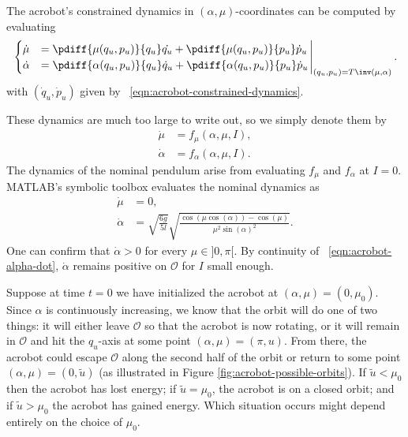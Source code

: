 The acrobot's constrained dynamics in
\((\alpha,\mu)\)-coordinates can be computed by evaluating
\begin{equation*}
\left.\begin{cases}
    \dot{\mu} &= \pdiff{\mu(q_u,p_u)}{q_u}\dot{q_u} +
         \pdiff{\mu(q_u,p_u)}{p_u}\dot{p}_u
    \\
    \dot{\alpha} &= \pdiff{\alpha(q_u,p_u)}{q_u}\dot{q}_u + 
        \pdiff{\alpha(q_u,p_u)}{p_u}\dot{p}_u
    \end{cases}\right|_{(q_u,p_u) = T\inv(\mu,\alpha)}
    .
\end{equation*}
with \((\dot{q}_u,\dot{p}_u)\) given by 
 ~\eqref{eqn:acrobot-constrained-dynamics}.

These dynamics are much too large to write out, so we simply denote them by
\begin{align}\label{eqn:acrobot-mu-dot}
    \dot{\mu} &= f_\mu(\alpha,\mu,I)
    ,\\
    \label{eqn:acrobot-alpha-dot}
    \dot{\alpha} &= f_\alpha(\alpha,\mu,I)
    .
\end{align}
The dynamics of the nominal pendulum arise from evaluating
\(f_\mu\) and \(f_\alpha\) at \(I = 0\).
MATLAB's symbolic toolbox evaluates the nominal dynamics as
\begin{align}\label{eqn:acrobot-mu-dot-nom}
    \dot{\mu} &= 0
    , \\
    \label{eqn:acrobot-alpha-dot-nom}
    \dot{\alpha} &= \sqrt{\frac{6g}{5l}} 
        \sqrt{\frac{\cos(\mu\cos(\alpha)) - \cos(\mu)}
            {\mu^2 \sin(\alpha)^2}}
    .
\end{align}
One can confirm that \(\dot{\alpha} > 0\) for every \(\mu \in ]0,\pi[\).
By continuity of ~\eqref{eqn:acrobot-alpha-dot}, 
\(\dot{\alpha}\) remains positive on \(\mathcal{O}\) for \(I\) small enough.

Suppose at time \(t = 0\) we have initialized the acrobot at \((\alpha,\mu) = (0,\mu_0)\).
Since \(\alpha\) is continuously increasing, we know that the orbit will do one
of two things: it will either leave \(\mathcal{O}\) so that the acrobot is now rotating,
or it will remain in \(\mathcal{O}\) and hit the \(q_u\)-axis at some point 
\((\alpha,\mu) = (\pi,u)\).
From there, the acrobot could escape \(\mathcal{O}\) along the second half of the orbit or
return to some point \((\alpha,\mu) = (0,\tilde{u})\) (as illustrated in Figure
\ref{fig:acrobot-possible-orbits}).
If \(\tilde{u} < \mu_0\) then the acrobot has lost energy; 
if \(\tilde{u} = \mu_0\), the acrobot is on a closed orbit;
and if \(\tilde{u} > \mu_0\) the acrobot has gained energy.
Which situation occurs might depend entirely on the choice of
\(\mu_0\).

